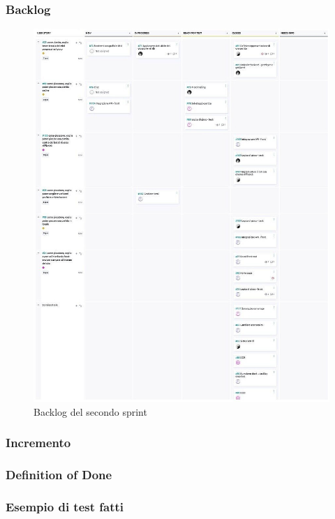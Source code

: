\documentclass{article}
\begin{document}
\subsubsection{Backlog}
\begin{figure}[H]
    \centering
    \includegraphics[width=1\textwidth]{backlog2}
    \caption{Backlog del secondo sprint}
    \label{fig:backlog2}
\end{figure}

\subsubsection{Incremento}

\subsubsection{Definition of Done}

\subsubsection{Esempio di test fatti}
\end{document}
